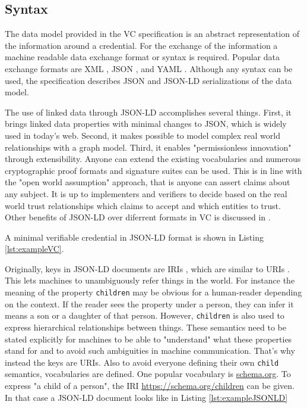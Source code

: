 \subsection{Syntax}

The data model provided in the \acrshort{VC} specification is an abstract representation of the information around a credential. For the exchange of the information a machine readable data exchange format or syntax is required. Popular data exchange formats are XML \parencite{xmlRFC}, \acrshort{JSON} \parencite{jsonRFC}, and \acrshort{YAML} \parencite{yaml}. Although any syntax can be used, the specification describes \acrshort{JSON} and \acrshort{JSON-LD} \parencite{jsonld} serializations of the data model. 

The use of linked data through \acrshort{JSON-LD} accomplishes several things. First, it  brings linked data properties with minimal changes to \acrshort{JSON}, which is widely used in today's web. Second, it makes possible to model complex real world relationships with a graph model. Third, it enables "permissionless innovation" through extensibility. Anyone can extend the existing vocabularies and numerous cryptographic proof formats and signature suites can be used. This is in line with the "open world assumption" approach, that is anyone can assert claims about any subject. It is up to implementers and verifiers to decide based on the real world trust relationships which claims to accept and which entities to trust. Other benefits of \acrshort{JSON-LD} over diferrent formats in \acrlong{VC} is discussed in \cite{young_2021}. 

A minimal verifiable credential in \acrshort{JSON-LD} format is shown in Listing \ref{lst:exampleVC}.



Originally, keys in \acrshort{JSON-LD} documents are \acrfull{IRI}s \parencite{rfc3987}, which are similar to \acrfull{URI}s \parencite{rfc3986}. This lets machines to unambiguously refer things in the world. For instance the meaning of the property \lstinline{children} may be obvious for a human-reader depending on the context. If the reader sees the property under a person, they can infer it means a son or a daughter of that person. However, \lstinline{children} is also used to express hierarchical relationships between things. These semantics need to be stated explicitly for machines to be able to "understand" what these properties stand for and to avoid such ambiguities in machine communication. That's why instead the keys are \acrshort{URI}s. Also to avoid everyone defining their own \lstinline{child} semantics, vocabularies are defined. One popular vocabulary is \url{schema.org}. To express "a child of a person", the \acrshort{IRI} \url{https://schema.org/children} can be given. In that case a \acrshort{JSON-LD} document looks like in Listing \ref{lst:exampleJSONLD}

